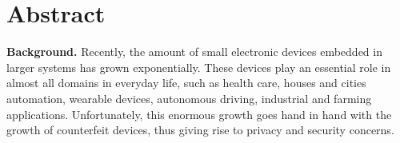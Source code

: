 \chapter*{Abstract}

\textbf{Background.} Recently, the amount of small electronic devices embedded in larger systems has grown exponentially. These devices play an essential role in almost all domains in everyday life, such as health care, houses and cities  automation, wearable devices, autonomous driving, industrial and farming applications. Unfortunately, this enormous growth goes hand in hand with the growth of counterfeit devices, thus giving rise to privacy and security concerns. 

